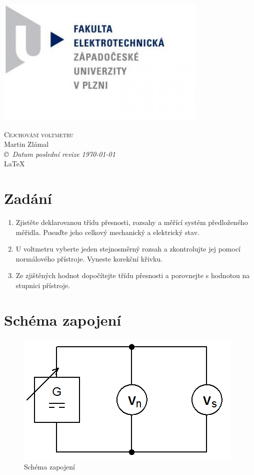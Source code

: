 \documentclass[12pt]{article} %
\newcommand{\bigsize}{\fontsize{35pt}{20pt}\selectfont}
\begin{document}
\begin{titlepage}
	\includegraphics[scale=0.7]{logo.jpg}
	\vspace*{\fill}
	\begin{center}
		\textsc{\LARGE \bigsize Cejchování voltmetru}\\[1cm]
		Martin Zlámal \\[1cm]
		{\small\em \copyright \ Datum poslední revize \today } \\
		\LaTeX
	\end{center}
	\vspace*{\fill}
\end{titlepage}
\tableofcontents
\listoffigures
\listoftables
\newpage

\section{Zadání}
\begin{enumerate}
\item Zjistěte deklarovanou třídu přesnosti, rozsahy a měřící systém předloženého
měřidla. Posuďte jeho celkový mechanický a elektrický stav.
\item U voltmetru vyberte jeden stejnosměrný rozsah a zkontrolujte jej pomocí
normálového přístroje. Vyneste korekční křivku.
\item Ze zjištěných hodnot dopočítejte třídu přesnosti a porovnejte s hodnotou na stupnici
přístroje.
\end{enumerate}

\section{Schéma zapojení}
\begin{figure}[H]
\center
\includegraphics[scale=0.7]{schema.png}
\caption{Schéma zapojení}
\end{figure}
\end{document}
